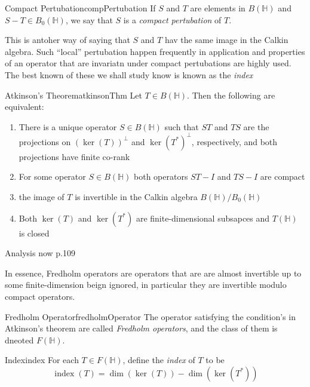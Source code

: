 \documentclass[oneside]{book}
\renewcommand{\H}{\mathbb{H}}
\begin{document}
\begin{defn}{Compact Pertubation}{compPertubation}
	If $S$ and
	$T$ are elements in $B(\H)$ and $S-T \in B_0(\H)$, we say that $S$ is a \emph{compact pertubation} of $T$.
\end{defn}

This is antoher way of saying that $S$ and $T$ hav the same image in the Calkin algebra. Such ``local'' pertubation
happen frequently in application and properties of an operator that are invariatn under compact pertubations are
highly used. The best known of these we shall study know is known as the \emph{index}

\begin{thm}{Atkinson's Theorem}{atkinsonThm}
	Let $T \in B(\H)$. Then the following are equivalent:
	\begin{enumerate}
		\item There is a unique operator $S \in B(\H)$ such that $ST$ and $TS$ are the projections on
			$(\ker(T))^\perp$ and $\ker(T^*)^\perp$, respectively, and both projections have
			finite co-rank
		\item For some operator $S \in B(\H)$ both operators $ST-I$ and $TS - I$ are compact
		\item the image of $T$ is invertible in the Calkin algebra $B(\H)/B_0(\H)$
		\item Both $\ker(T)$ and $\ker(T^*)$ are finite-dimensional subsapces and $T(\H)$ is closed
	\end{enumerate}
\end{thm}

\begin{Proof}
	Analysis now p.109
\end{Proof}

In essence, Fredholm operators are operators that are are almost invertible up to some finite-dimension beign ignored,
in particular they are invertible modulo compact operators.

\begin{defn}{Fredholm Operator}{fredholmOperator}
	The operator satisfying the condition's in Atkinson's theorem are called \emph{Fredholm operators}, and
	the class of them is dneoted $F(\H)$.
\end{defn}

\begin{defn}{Index}{index}
	For each $T \in F(\H)$, define the \emph{index} of $T$ to be
	\[
		\operatorname{index}(T) = \dim(\ker(T)) - \dim(\ker(T^*))
	\]
\end{defn}
\end{document}
